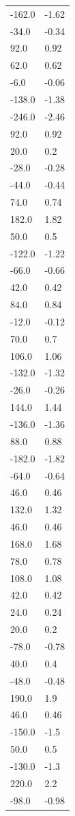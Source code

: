 \begin{longtable}{ll}
-162.0 & -1.62 \\
-34.0 & -0.34 \\
92.0 & 0.92 \\
62.0 & 0.62 \\
-6.0 & -0.06 \\
-138.0 & -1.38 \\
-246.0 & -2.46 \\
92.0 & 0.92 \\
20.0 & 0.2 \\
-28.0 & -0.28 \\
-44.0 & -0.44 \\
74.0 & 0.74 \\
182.0 & 1.82 \\
50.0 & 0.5 \\
-122.0 & -1.22 \\
-66.0 & -0.66 \\
42.0 & 0.42 \\
84.0 & 0.84 \\
-12.0 & -0.12 \\
70.0 & 0.7 \\
106.0 & 1.06 \\
-132.0 & -1.32 \\
-26.0 & -0.26 \\
144.0 & 1.44 \\
-136.0 & -1.36 \\
88.0 & 0.88 \\
-182.0 & -1.82 \\
-64.0 & -0.64 \\
46.0 & 0.46 \\
132.0 & 1.32 \\
46.0 & 0.46 \\
168.0 & 1.68 \\
78.0 & 0.78 \\
108.0 & 1.08 \\
42.0 & 0.42 \\
24.0 & 0.24 \\
20.0 & 0.2 \\
-78.0 & -0.78 \\
40.0 & 0.4 \\
-48.0 & -0.48 \\
190.0 & 1.9 \\
46.0 & 0.46 \\
-150.0 & -1.5 \\
50.0 & 0.5 \\
-130.0 & -1.3 \\
220.0 & 2.2 \\
-98.0 & -0.98 \\

\end{longtable}
